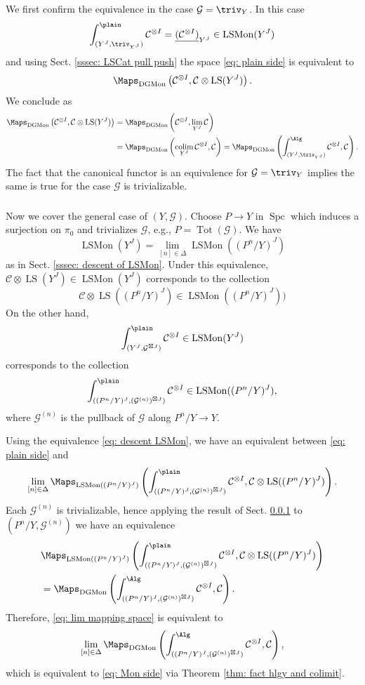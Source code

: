 \documentclass[10pt]{amsart}
\newcommand{\sssec}{\subsubsection}
\theoremstyle{remark}
\newcommand{\ul}{\underline}
\newcommand{\on}{\operatorname}
\newcommand{\cC}{\mathcal{C}}
\newcommand{\cG}{\mathcal{G}}
\newcommand{\LSMon}{\on{LSMon}}
\newcommand{\DGCatMon}{\on{DGMon}}
\newcommand{\LS}{\on{LS}}
\newcommand{\Spc}{\on{Spc}}
\DeclareMathOperator{\colim}{colim}
\begin{document}
\sssec{}\label{sssec: trivializable case}
We first confirm the equivalence in the case $\cG=\triv_Y$. In this case \[\int^{\plain}_{(Y^J,\triv_{Y^J})}\cC^{\otimes I}=\ul{(\cC^{\otimes I})}_{Y^J}\in\LSMon(Y^J)\]
and using Sect. \ref{sssec: LSCat pull push} the space \eqref{eq: plain side} is equivalent to 
\[\Maps_{\DGCatMon}\left(\cC^{\otimes I}, \cC\otimes \LS(Y^J)\right).\]
We conclude as
\begin{align*}
    \Maps_{\DGCatMon}\left(\cC^{\otimes I}, \cC\otimes \LS(Y^J)\right)&=\Maps_{\DGCatMon}\left(\cC^{\otimes I}, \lim_{Y^J}\cC\right)\\
    &=\Maps_{\DGCatMon}\left(\colim_{Y^J}\cC^{\otimes I},\cC\right)=\Maps_{\DGCatMon}\left(\int^{\Alg}_{(Y^J,\triv_{Y^J})}\cC^{\otimes I}, \cC\right).
\end{align*}
The fact that the canonical functor is an equivalence for $\cG=\triv_Y$ implies the same is true for the case $\cG$ is trivializable.

\sssec{}
    Now we cover the general case of $(Y,\cG)$. Choose $P\rightarrow Y$ in $\Spc$ which induces a surjection on $\pi_0$ and trivializes $\cG$, e.g., $P=\on{Tot}(\cG)$.
    We have
    \begin{equation}\label{eq: descent LSMon}
        \LSMon(Y^J)=\lim_{[n]\in\Delta}\LSMon((P^n/Y)^J)
    \end{equation}
    as in Sect. \ref{sssec: descent of LSMon}.
    Under this equivalence, $\cC\otimes\LS(Y^J) \in \LSMon(Y^J)$ corresponds to the collection
    \[\cC\otimes\LS((P^n/Y)^J)\in\LSMon((P^n/Y)^J))\]
    On the other hand,
    \[\int^{\plain}_{(Y^J, \cG^{\boxtimes J})}\cC^{\otimes I}\in \LSMon(Y^J)\]
    corresponds to the collection
    \[\int^{\plain}_{((P^n/Y)^J,(\cG^{(n)})^{\boxtimes J})}\cC^{\otimes I}\in \LSMon((P^n/Y)^J),\]
    where $\cG^{(n)}$ is the pullback of $\cG$ along $P^n/Y\rightarrow Y$.
    \medskip
    
Using the equivalence \eqref{eq: descent LSMon}, we have an equivalent between \eqref{eq: plain side} and
\begin{equation}\label{eq: lim mapping space}
\lim_{[n]\in\Delta} \Maps_{\LSMon((P^n/Y)^J)}\left(\int^{\plain}_{((P^n/Y)^J,(\cG^{(n)})^{\boxtimes J})}\cC^{\otimes I}, \cC\otimes \LS((P^n/Y)^J)\right).
\end{equation}
Each $\cG^{(n)}$ is trivializable, hence applying the result of Sect. \ref{sssec: trivializable case} to $(P^n/Y,\cG^{(n)})$ we have an equivalence
\begin{align*}
    &\Maps_{\LSMon((P^n/Y)^J)}\left(\int^{\plain}_{((P^n/Y)^J,(\cG^{(n)})^{\boxtimes J})}\cC^{\otimes I}, \cC\otimes \LS((P^n/Y)^J)\right)\\
    &= \Maps_{\DGCatMon}\left(\int^{\Alg}_{( (P^n/Y)^J, (\cG^{(n)})^{\boxtimes J})}\cC^{\otimes I}, \cC\right).
\end{align*}
Therefore, \eqref{eq: lim mapping space} is equivalent to
\begin{equation}\label{eq: lim mapping Alg side}
    \lim_{[n]\in\Delta}\Maps_{\DGCatMon}\left(\int^{\Alg}_{( (P^n/Y)^J, (\cG^{(n)})^{\boxtimes J})}\cC^{\otimes I}, \cC\right),
\end{equation}
which is equivalent to \eqref{eq: Mon side} via Theorem \ref{thm: fact hlgy and colimit}.
\medskip
\end{document}
